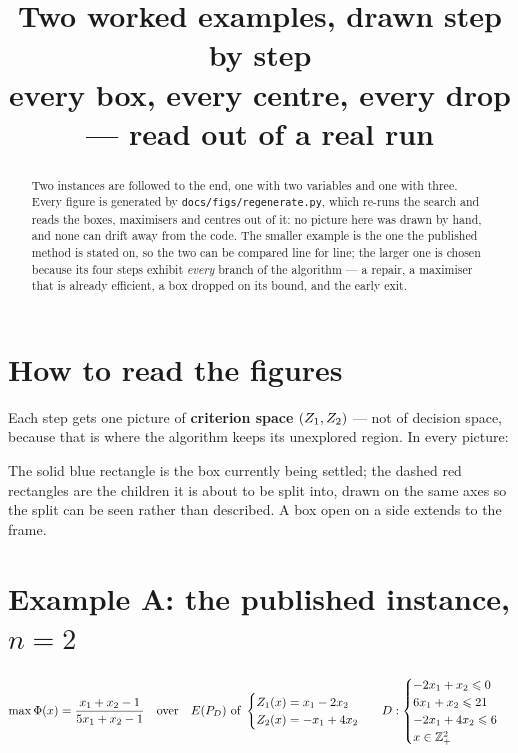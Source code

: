 \documentclass[11pt,a4paper]{article}
\title{Two worked examples, drawn step by step\\
\large every box, every centre, every drop --- read out of a real run}
\author{}
\date{}
\begin{document}
\maketitle

\begin{abstract}
Two instances are followed to the end, one with two variables and one with
three.  Every figure is generated by \texttt{docs/figs/regenerate.py}, which
re-runs the search and reads the boxes, maximisers and centres out of it: no
picture here was drawn by hand, and none can drift away from the code.  The
smaller example is the one the published method is stated on, so the two can be
compared line for line; the larger one is chosen because its four steps exhibit
\emph{every} branch of the algorithm --- a repair, a maximiser that is already
efficient, a box dropped on its bound, and the early exit.
\end{abstract}

\tableofcontents

\section{How to read the figures}

Each step gets one picture of \textbf{criterion space} $(Z_1, Z_2)$ --- not of
decision space, because that is where the algorithm keeps its unexplored
region.  In every picture:

\figlegend

\noindent
The solid blue rectangle is the box currently being settled; the dashed red
rectangles are the children it is about to be split into, drawn on the same
axes so the split can be seen rather than described.  A box open on a side
extends to the frame.

\section{Example A: the published instance, $n = 2$}

\begin{equation*}
\max \Phi(x) = \frac{x_1 + x_2 - 1}{5x_1 + x_2 - 1}
\quad\text{over}\quad
E(P_{D}) \ \text{of} \
\begin{cases}
  Z_1(x) = x_1 - 2x_2 \\ Z_2(x) = -x_1 + 4x_2
\end{cases}
\ \
D :
\begin{cases}
  -2x_1 + x_2 \leqslant 0 \\
  6x_1 + x_2 \leqslant 21 \\
  -2x_1 + 4x_2 \leqslant 6 \\
  x \in \mathbb{Z}^2_+
\end{cases}
\end{equation*}
\end{document}

